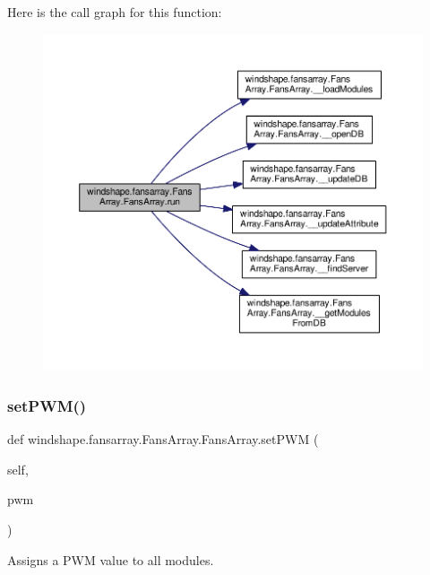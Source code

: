 Here is the call graph for this function\+:\nopagebreak
\begin{figure}[H]
\begin{center}
\leavevmode
\includegraphics[width=350pt]{classwindshape_1_1fansarray_1_1_fans_array_1_1_fans_array_afa94dcdf36ecce45c8189bb68fe8efe9_cgraph}
\end{center}
\end{figure}
\mbox{\label{classwindshape_1_1fansarray_1_1_fans_array_1_1_fans_array_a420bbec4827c3a8fb3bff65aaba918d7}} 
\subsubsection{\texorpdfstring{set\+P\+W\+M()}{setPWM()}}
{\footnotesize\ttfamily def windshape.\+fansarray.\+Fans\+Array.\+Fans\+Array.\+set\+P\+WM (\begin{DoxyParamCaption}\item[{}]{self,  }\item[{}]{pwm }\end{DoxyParamCaption})}

\begin{DoxyVerb}Assigns a PWM value to all modules.\end{DoxyVerb}
 

